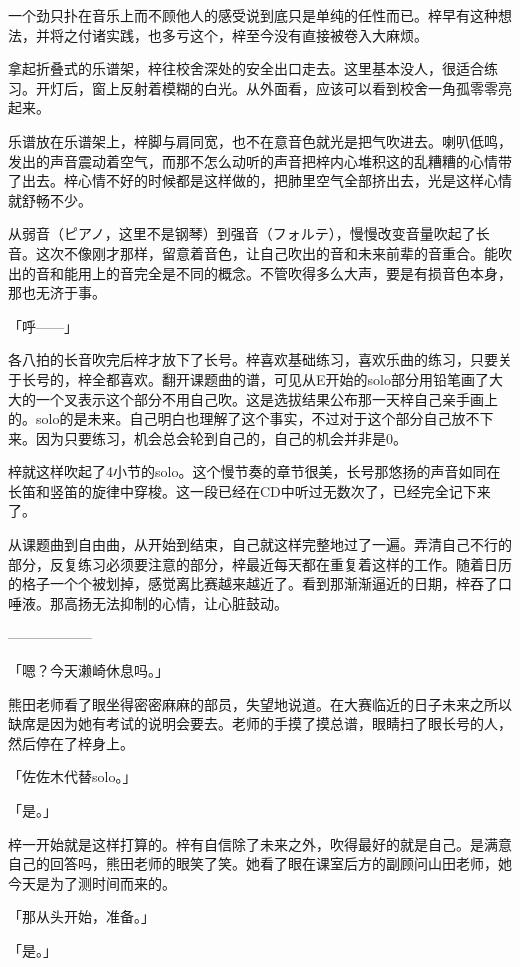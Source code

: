 \documentclass[UTF8]{ctexart}
\begin{document}
    一个劲只扑在音乐上而不顾他人的感受说到底只是单纯的任性而已。梓早有这种想法，并将之付诸实践，也多亏这个，梓至今没有直接被卷入大麻烦。

    拿起折叠式的乐谱架，梓往校舍深处的安全出口走去。这里基本没人，很适合练习。开灯后，窗上反射着模糊的白光。从外面看，应该可以看到校舍一角孤零零亮起来。

    乐谱放在乐谱架上，梓脚与肩同宽，也不在意音色就光是把气吹进去。喇叭低鸣，发出的声音震动着空气，而那不怎么动听的声音把梓内心堆积这的乱糟糟的心情带了出去。梓心情不好的时候都是这样做的，把肺里空气全部挤出去，光是这样心情就舒畅不少。

    从弱音（ピアノ，这里不是钢琴）到强音（フォルテ），慢慢改变音量吹起了长音。这次不像刚才那样，留意着音色，让自己吹出的音和未来前辈的音重合。能吹出的音和能用上的音完全是不同的概念。不管吹得多么大声，要是有损音色本身，那也无济于事。

    「呼——」

    各八拍的长音吹完后梓才放下了长号。梓喜欢基础练习，喜欢乐曲的练习，只要关于长号的，梓全都喜欢。翻开课题曲的谱，可见从E开始的solo部分用铅笔画了大大的一个叉表示这个部分不用自己吹。这是选拔结果公布那一天梓自己亲手画上的。solo的是未来。自己明白也理解了这个事实，不过对于这个部分自己放不下来。因为只要练习，机会总会轮到自己的，自己的机会并非是0。

    梓就这样吹起了4小节的solo。这个慢节奏的章节很美，长号那悠扬的声音如同在长笛和竖笛的旋律中穿梭。这一段已经在CD中听过无数次了，已经完全记下来了。

    从课题曲到自由曲，从开始到结束，自己就这样完整地过了一遍。弄清自己不行的部分，反复练习必须要注意的部分，梓最近每天都在重复着这样的工作。随着日历的格子一个个被划掉，感觉离比赛越来越近了。看到那渐渐逼近的日期，梓吞了口唾液。那高扬无法抑制的心情，让心脏鼓动。

    ——————

    「嗯？今天濑崎休息吗。」

    熊田老师看了眼坐得密密麻麻的部员，失望地说道。在大赛临近的日子未来之所以缺席是因为她有考试的说明会要去。老师的手摸了摸总谱，眼睛扫了眼长号的人，然后停在了梓身上。

    「佐佐木代替solo。」

    「是。」

    梓一开始就是这样打算的。梓有自信除了未来之外，吹得最好的就是自己。是满意自己的回答吗，熊田老师的眼笑了笑。她看了眼在课室后方的副顾问山田老师，她今天是为了测时间而来的。

    「那从头开始，准备。」

    「是。」
\end{document}
